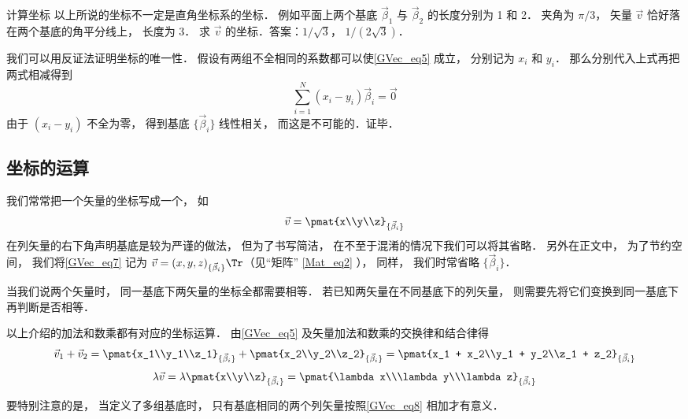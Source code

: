 \begin{exer}{计算坐标}
以上所说的坐标不一定是直角坐标系的坐标． 例如平面上两个基底 $\vec \beta_1$ 与 $\vec \beta_2$ 的长度分别为 1 和 2． 夹角为 $\pi/3$， 矢量 $\vec v$ 恰好落在两个基底的角平分线上， 长度为 3． 求 $\vec v$ 的坐标．答案：$1/\sqrt 3$， $1/(2\sqrt 3)$．
\end{exer}

我们可以用反证法证明坐标的唯一性． 假设有两组不全相同的系数都可以使\autoref{GVec_eq5} 成立， 分别记为 $x_i$ 和 $y_i$． 那么分别代入上式再把两式相减得到
\begin{equation}
\sum_{i=1}^N (x_i-y_i) \vec \beta_i = \vec 0
\end{equation}
由于 $(x_i-y_i)$ 不全为零， 得到基底 $\{\vec \beta_i\}$ 线性相关， 而这是不可能的．证毕．

\subsection{坐标的运算}
我们常常把一个矢量的坐标写成一个， 如
\begin{equation}\label{GVec_eq7}
\vec v = \pmat{x\\y\\z}_{\{\vec\beta_i\}}
\end{equation}
在列矢量的右下角声明基底是较为严谨的做法， 但为了书写简洁， 在不至于混淆的情况下我们可以将其省略． 另外在正文中， 为了节约空间， 我们将\autoref{GVec_eq7} 记为 $\vec v = (x, y, z)_{\{\vec\beta_i\}}\Tr$（见“矩阵” \autoref{Mat_eq2} ）， 同样， 我们时常省略 $\{\vec\beta_i\}$．

当我们说两个矢量时， 同一基底下两矢量的坐标全都需要相等． 若已知两矢量在不同基底下的列矢量， 则需要先将它们变换到同一基底下再判断是否相等．

以上介绍的加法和数乘都有对应的坐标运算． 由\autoref{GVec_eq5} 及矢量加法和数乘的交换律和结合律得
\begin{equation}\label{GVec_eq8}
\vec v_1 + \vec v_2 = \pmat{x_1\\y_1\\z_1}_{\{\vec\beta_i\}} + \pmat{x_2\\y_2\\z_2}_{\{\vec\beta_i\}} = \pmat{x_1 + x_2\\y_1 + y_2\\z_1 + z_2}_{\{\vec\beta_i\}}
\end{equation}
\begin{equation}\label{GVec_eq9}
\lambda \vec v = \lambda\pmat{x\\y\\z}_{\{\vec\beta_i\}} = \pmat{\lambda x\\\lambda y\\\lambda z}_{\{\vec\beta_i\}}
\end{equation}

要特别注意的是， 当定义了多组基底时， 只有基底相同的两个列矢量按照\autoref{GVec_eq8} 相加才有意义．





